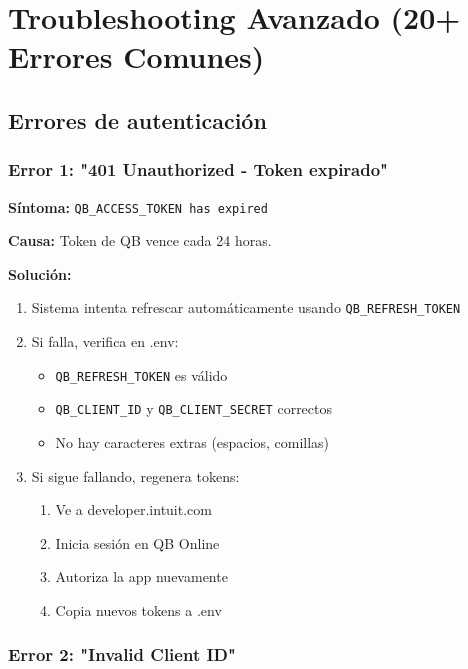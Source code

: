\documentclass[12pt,oneside]{article}
\begin{document}
\newpage

\section{Troubleshooting Avanzado (20+ Errores Comunes)}

\subsection{Errores de autenticación}

\subsubsection{Error 1: "401 Unauthorized - Token expirado"}

\textbf{Síntoma:} \texttt{QB_ACCESS_TOKEN has expired}

\textbf{Causa:} Token de QB vence cada 24 horas.

\textbf{Solución:}
\begin{enumerate}
    \item Sistema intenta refrescar automáticamente usando \texttt{QB_REFRESH_TOKEN}
    \item Si falla, verifica en .env:
    \begin{itemize}
        \item \texttt{QB_REFRESH_TOKEN} es válido
        \item \texttt{QB_CLIENT_ID} y \texttt{QB_CLIENT_SECRET} correctos
        \item No hay caracteres extras (espacios, comillas)
    \end{itemize}
    \item Si sigue fallando, regenera tokens:
    \begin{enumerate}
        \item Ve a developer.intuit.com
        \item Inicia sesión en QB Online
        \item Autoriza la app nuevamente
        \item Copia nuevos tokens a .env
    \end{enumerate}
\end{enumerate}

\subsubsection{Error 2: "Invalid Client ID"}
\end{document}
